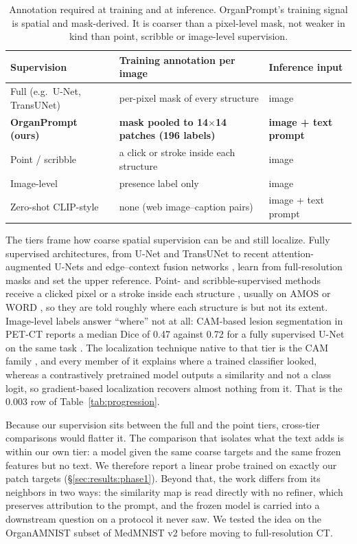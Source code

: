 \documentclass[10pt]{article}
\begin{document}
\begin{table}[!htbp]
\centering
\small
\caption{Annotation required at training and at inference. OrganPrompt's
training signal is spatial and mask-derived. It is coarser than a pixel-level
mask, not weaker in kind than point, scribble or image-level supervision.}
\label{tab:supervision}
\begin{tabular}{lll}
\toprule
Supervision & Training annotation per image & Inference input \\
\midrule
Full (e.g.\ U-Net, TransUNet) & per-pixel mask of every structure & image \\
\textbf{OrganPrompt (ours)} & \textbf{mask pooled to 14$\times$14 patches (196 labels)} & \textbf{image + text prompt} \\
Point / scribble & a click or stroke inside each structure & image \\
Image-level & presence label only & image \\
Zero-shot CLIP-style & none (web image--caption pairs) & image + text prompt \\
\bottomrule
\end{tabular}
\end{table}

The tiers frame how coarse spatial supervision can be and still localize.
Fully supervised architectures, from U-Net \cite{ronneberger2015unet} and
TransUNet \cite{chen2021transunet} to recent attention-augmented U-Nets
\cite{xiao2025resunet} and edge--context fusion networks \cite{xiao2025brainseg},
learn from full-resolution masks and set the upper reference. Point- and
scribble-supervised methods receive a clicked pixel or a stroke inside each
structure \cite{jiang2024probabilistic}, usually on AMOS \cite{ji2022amos} or WORD
\cite{luo2022word}, so they are told roughly where each structure is but not its
extent. Image-level labels answer ``where'' not at all: CAM-based lesion
segmentation in PET-CT reports a median Dice of 0.47 against 0.72 for a fully
supervised U-Net on the same task \cite{fruh2021petct}. The localization technique
native to that tier is the CAM family \cite{zhou2016cam, selvaraju2017gradcam,
chattopadhay2018gradcampp}, and every member of it explains where a trained
classifier looked, whereas a contrastively pretrained model outputs a similarity
and not a class logit, so gradient-based localization recovers almost nothing
from it. That is the 0.003 row of Table~\ref{tab:progression}.

Because our supervision sits between the full and the point tiers, cross-tier
comparisons would flatter it. The comparison that isolates what the text adds is
within our own tier: a model given the same coarse targets and the same frozen
features but no text. We therefore report a linear probe trained on exactly our
patch targets (\S\ref{sec:results:phase1}). Beyond that, the work differs from
its neighbors in two ways: the similarity map is read directly with no refiner,
which preserves attribution to the prompt, and the frozen model is carried into a
downstream question on a protocol it never saw. We tested the idea on the
OrganAMNIST subset of MedMNIST v2 \cite{yang2023medmnist} before moving to
full-resolution CT.
\end{document}
